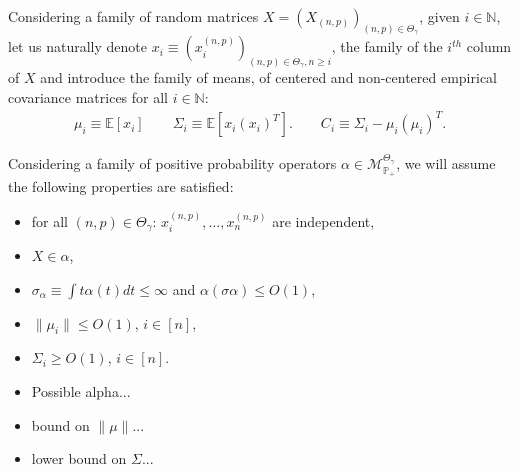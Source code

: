 \documentclass[ECP, preprint]{ejpecp} %
\begin{document}
Considering a family of random matrices $X = (X_{(n,p)})_{(n,p)\in \Theta_\gamma}$, given $i\in \mathbb N$, let us naturally denote $x_i \equiv (x_i^{(n,p)})_{(n,p)\in \Theta_\gamma, n\geq i}$, the family of the $i^{th}$ column of $X$ and introduce the family of means, of centered and non-centered empirical covariance matrices for all $i\in \mathbb N$:
\begin{align*}
     \mu_i\equiv \mathbb E[x_i]
     \qquad \Sigma_i \equiv \mathbb E[x_i(x_i)^T].
     \qquad C_i \equiv \Sigma_i - \mu_i(\mu_i)^T.
\end{align*} 

Considering a family of positive probability operators $\alpha \in \mathcal M_{\mathbb P_+}^{\Theta_\gamma}$, we will assume the following properties are satisfied:
\begin{itemize}
    \item for all $(n,p)\in \Theta_\gamma$: $x_i^{(n,p)},\ldots, x_n^{(n,p)}$ are independent,
    \item $X \in \alpha$,
    \item $\sigma_\alpha \equiv \int t\alpha(t) dt \leq \infty$ and $\alpha(\sigma\alpha)\leq O(1)$,
    \item $\|\mu_i\| \leq O(1)$, $i\in [n]$,
    \item $\Sigma_i \geq O(1)$, $i\in [n]$.
\end{itemize}

\begin{remark}\label{rem:comment_on_assumptions}
    \begin{itemize}
        \item Possible alpha...
        \item bound on $\|\mu\|$...
        \item lower bound on $\Sigma$...
    \end{itemize}
\end{remark}
\end{document}
